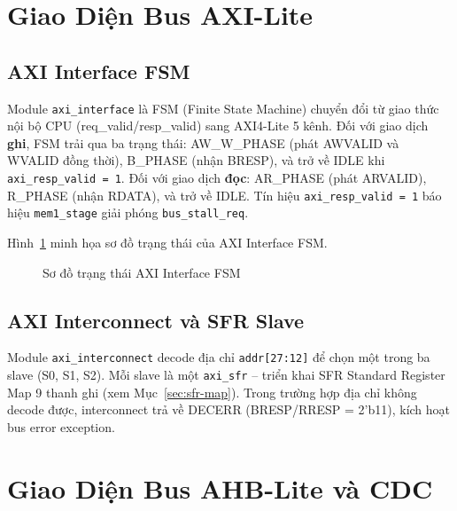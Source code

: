 \section{Giao Diện Bus AXI-Lite}

\subsection{AXI Interface FSM}

Module \texttt{axi\_interface} là FSM (Finite State Machine) chuyển đổi từ giao thức nội bộ CPU (req\_valid/resp\_valid) sang AXI4-Lite 5 kênh. Đối với giao dịch \textbf{ghi}, FSM trải qua ba trạng thái: AW\_W\_PHASE (phát AWVALID và WVALID đồng thời), B\_PHASE (nhận BRESP), và trở về IDLE khi \texttt{axi\_resp\_valid = 1}. Đối với giao dịch \textbf{đọc}: AR\_PHASE (phát ARVALID), R\_PHASE (nhận RDATA), và trở về IDLE. Tín hiệu \texttt{axi\_resp\_valid = 1} báo hiệu \texttt{mem1\_stage} giải phóng \texttt{bus\_stall\_req}.

Hình~\ref{fig:axi-fsm} minh họa sơ đồ trạng thái của AXI Interface FSM.

\begin{figure}[htp]
\centering
{}
\caption{Sơ đồ trạng thái AXI Interface FSM}
\label{fig:axi-fsm}
\end{figure}

\subsection{AXI Interconnect và SFR Slave}

Module \texttt{axi\_interconnect} decode địa chỉ \texttt{addr[27:12]} để chọn một trong ba slave (S0, S1, S2). Mỗi slave là một \texttt{axi\_sfr} -- triển khai SFR Standard Register Map 9 thanh ghi (xem Mục~\ref{sec:sfr-map}). Trong trường hợp địa chỉ không decode được, interconnect trả về DECERR (BRESP/RRESP = 2'b11), kích hoạt bus error exception.

\section{Giao Diện Bus AHB-Lite và CDC}

